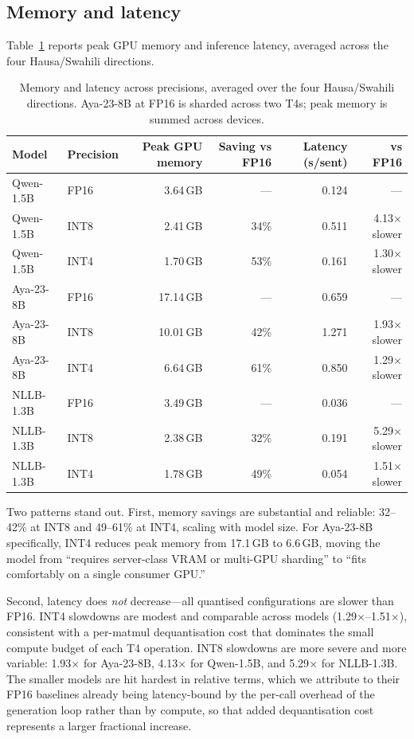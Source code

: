 \documentclass[11pt,a4paper]{article}
\begin{document}
\subsection{Memory and latency}

Table~\ref{tab:cost} reports peak GPU memory and inference latency,
averaged across the four Hausa/Swahili directions.

\begin{table}[h]
\centering
\small
\begin{tabular}{llrrrr}
\toprule
Model & Precision & Peak GPU memory & Saving vs FP16 &
Latency (s/sent) & vs FP16 \\
\midrule
Qwen-1.5B & FP16 & 3.64\,GB & --- & 0.124 & --- \\
Qwen-1.5B & INT8 & 2.41\,GB & 34\% & 0.511 & 4.13$\times$ slower \\
Qwen-1.5B & INT4 & 1.70\,GB & 53\% & 0.161 & 1.30$\times$ slower \\
\addlinespace
Aya-23-8B & FP16 & 17.14\,GB & --- & 0.659 & --- \\
Aya-23-8B & INT8 & 10.01\,GB & 42\% & 1.271 & 1.93$\times$ slower \\
Aya-23-8B & INT4 & 6.64\,GB & 61\% & 0.850 & 1.29$\times$ slower \\
\addlinespace
NLLB-1.3B & FP16 & 3.49\,GB & --- & 0.036 & --- \\
NLLB-1.3B & INT8 & 2.38\,GB & 32\% & 0.191 & 5.29$\times$ slower \\
NLLB-1.3B & INT4 & 1.78\,GB & 49\% & 0.054 & 1.51$\times$ slower \\
\bottomrule
\end{tabular}
\caption{Memory and latency across precisions, averaged over the four
Hausa/Swahili directions. Aya-23-8B at FP16 is sharded across two T4s;
peak memory is summed across devices.}
\label{tab:cost}
\end{table}

Two patterns stand out. First, memory savings are substantial and
reliable: 32--42\% at INT8 and 49--61\% at INT4, scaling with model
size. For Aya-23-8B specifically, INT4 reduces peak memory from
17.1\,GB to 6.6\,GB, moving the model from ``requires server-class
VRAM or multi-GPU sharding'' to ``fits comfortably on a single consumer
GPU.''

Second, latency does \emph{not} decrease---all quantised configurations
are slower than FP16. INT4 slowdowns are modest and comparable across
models (1.29$\times$--1.51$\times$), consistent with a per-matmul
dequantisation cost that dominates the small compute budget of each T4
operation. INT8 slowdowns are more severe and more variable:
1.93$\times$ for Aya-23-8B, 4.13$\times$ for Qwen-1.5B, and
5.29$\times$ for NLLB-1.3B. The smaller models are hit hardest in
relative terms, which we attribute to their FP16 baselines already
being latency-bound by the per-call overhead of the generation loop
rather than by compute, so that added dequantisation cost represents a
larger fractional increase.
\end{document}
